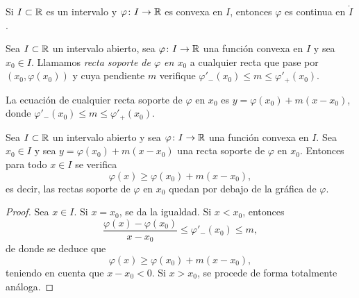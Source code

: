 \documentclass[a4paper, 11pt, oneside]{report}
\begin{document}
\begin{corollary}
  Si $I \subset \mathbb R$ es un intervalo y $\varphi \colon I \to \mathbb R$ es convexa en $I$, entonces $\varphi$ es continua en $\mathring{I}$.
\end{corollary}

\begin{definition}
  Sea $I \subset \mathbb R$ un intervalo abierto, sea $\varphi \colon I \to \mathbb R$ una función convexa en $I$ y sea $x_0 \in I$. Llamamos \emph{recta soporte de $\varphi$ en $x_0$} a cualquier recta que pase por $(x_0,\varphi(x_0))$ y cuya pendiente $m$ verifique $\varphi'_-(x_0) \leq m \leq \varphi'_+(x_0)$.
\end{definition}

La ecuación de cualquier recta soporte de $\varphi$ en $x_0$ es $y = \varphi(x_0)+m(x-x_0)$, donde $\varphi'_-(x_0) \leq m \leq \varphi'_+(x_0)$.

\begin{proposition}
  Sea $I \subset \mathbb R$ un intervalo abierto y sea $\varphi \colon I \to \mathbb R$ una función convexa en $I$. Sea $x_0 \in I$ y sea $y = \varphi(x_0)+m(x-x_0)$ una recta soporte de $\varphi$ en $x_0$. Entonces para todo $x \in I$ se verifica
  \[\varphi(x) \geq \varphi(x_0)+m(x-x_0),\]
  es decir, las rectas soporte de $\varphi$ en $x_0$ quedan por debajo de la gráfica de $\varphi$.
\end{proposition}

\begin{proof}
  Sea $x \in I$. Si $x = x_0$, se da la igualdad. Si $x < x_0$, entonces
  \[\frac{\varphi(x)-\varphi(x_0)}{x-x_0} \leq \varphi'_-(x_0) \leq m,\]
  de donde se deduce que
  \[\varphi(x) \geq \varphi(x_0) + m(x-x_0),\]
  teniendo en cuenta que $x-x_0 < 0$. Si $x>x_0$, se procede de forma totalmente análoga.
\end{proof}
\end{document}
